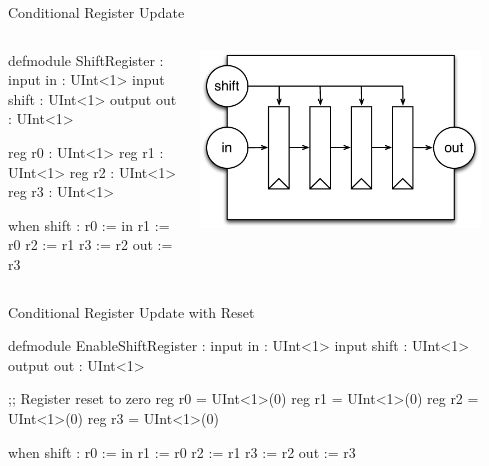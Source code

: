 \documentclass[xcolor=pdflatex,dvipsnames,table]{beamer}
\begin{document}
\begin{frame}[fragile]{Conditional Register Update}

\begin{columns}


\begin{stanza}
defmodule ShiftRegister :
  input in : UInt<1>
  input shift : UInt<1>
  output out : UInt<1>

  reg r0 : UInt<1>
  reg r1 : UInt<1>
  reg r2 : UInt<1>
  reg r3 : UInt<1>

  when shift :
    r0 := in
    r1 := r0
    r2 := r1
    r3 := r2
  out := r3
\end{stanza}


\begin{center}
\includegraphics[width=0.9\textwidth]{figs/enable-shift-register.pdf}
\end{center}

\end{columns}

\end{frame}

\begin{frame}[fragile]{Conditional Register Update with Reset}

\begin{stanza}
defmodule EnableShiftRegister :
  input in : UInt<1>
  input shift : UInt<1>
  output out : UInt<1>

  ;; Register reset to zero
  reg r0 = UInt<1>(0)
  reg r1 = UInt<1>(0)
  reg r2 = UInt<1>(0)
  reg r3 = UInt<1>(0)

  when shift :
    r0 := in
    r1 := r0
    r2 := r1
    r3 := r2
  out := r3
\end{stanza}

\end{frame}
\end{document}
